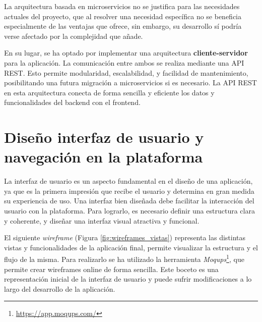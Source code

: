La arquitectura basada en microservicios no se justifica para las necesidades actuales del proyecto, que al resolver una necesidad específica no se beneficia especialmente de las ventajas que ofrece, sin embargo, su desarrollo sí podría verse afectado por la complejidad que añade. 

En su lugar, se ha optado por implementar una arquitectura \textbf{cliente-servidor} para la aplicación. La comunicación entre ambos se realiza mediante una API REST. Esto permite modularidad, escalabilidad, y facilidad de mantenimiento, posibilitando una futura migración a microservicios si es necesario. La API REST en esta arquitectura conecta de forma sencilla y eficiente los datos y funcionalidades del backend con el frontend.


\section{Diseño interfaz de usuario y navegación en la plataforma}
\label{sec:diseno_interfaz_usuario}
La interfaz de usuario es un aspecto fundamental en el diseño de una aplicación, ya que es la primera impresión que recibe el usuario y determina en gran medida su experiencia de uso. Una interfaz bien diseñada debe facilitar la interacción del usuario con la plataforma. Para lograrlo, es necesario definir una estructura clara y coherente, y diseñar una interfaz visual atractiva y funcional.

El siguiente \textit{wireframe} (Figura \ref{fig:wireframes_vistas}) representa las distintas vistas y funcionalidades de la aplicación final, permite visualizar la estructura y el flujo de la misma. Para realizarlo se ha utilizado la herramienta \textit{Moqups}\footnote{\url{https://app.moqups.com/}}, que permite crear wireframes online de forma sencilla. Este boceto es una representación inicial de la interfaz de usuario y puede sufrir modificaciones a lo largo del desarrollo de la aplicación.

